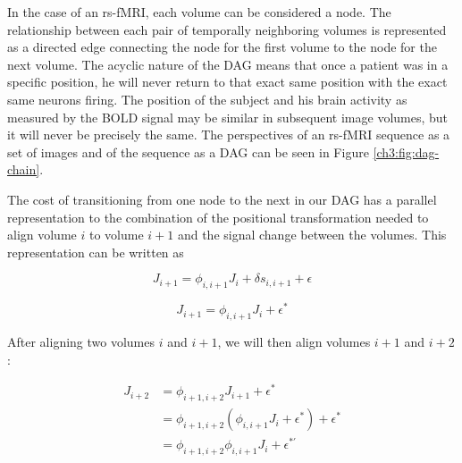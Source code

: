 In the case of an rs-fMRI, each volume can be considered a node. The relationship between each pair of temporally neighboring volumes is represented as a directed edge connecting the node for the first volume to the node for the next volume. The acyclic nature of the DAG means that once a patient was in a specific position, he will never return to that exact same position with the exact same neurons firing. The position of the subject and his brain activity as measured by the BOLD signal may be similar in subsequent image volumes, but it will never be precisely the same. The perspectives of an rs-fMRI sequence as a set of images and of the sequence as a DAG can be seen in Figure \ref{ch3:fig:dag-chain}.

The cost of transitioning from one node to the next in our DAG has a parallel representation to the combination of the positional transformation needed to align volume $i$ to volume $i+1$ and the signal change between the volumes. This representation can be written as 

\begin{equation}
J_{i+1} = \phi_{i,i+1} J_i + \delta s_{i,i+1} + \epsilon
\end{equation}


\begin{equation}
J_{i+1} = \phi_{i,i+1} J_i + \epsilon^*
\end{equation}


After aligning two volumes $i$ and $i+1$, we will then align volumes $i+1$ and $i+2$:

\begin{equation}
\begin{split}
J_{i+2} & = \phi_{i+1,i+2} J_{i+1} + \epsilon^* \\
& = \phi_{i+1,i+2} (\phi_{i,i+1} J_i + \epsilon^*) +\epsilon^*\\
& = \phi_{i+1,i+2} \phi_{i,i+1} J_i + \epsilon^{*'}\\
\end{split}
\end{equation}

